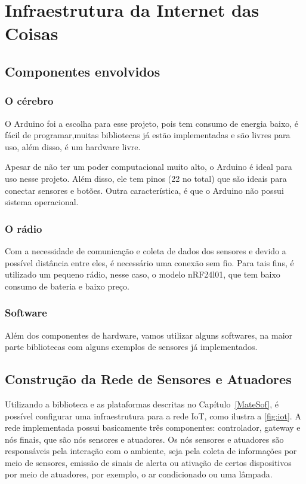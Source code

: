 %
\chapter{Infraestrutura da Internet das Coisas}


\section{Componentes envolvidos}

\subsection{O cérebro}

O Arduino foi a escolha para esse projeto, pois tem consumo de energia baixo, é fácil de programar,muitas bibliotecas já estão implementadas e são livres para uso, além disso, é um hardware livre. 

Apesar de não ter um poder computacional muito alto, o Arduino é ideal para uso nesse projeto. Além disso, ele tem pinos (22 no total) que são ideais para conectar sensores e botões. Outra característica, é que o Arduino não possui sistema operacional.

\subsection{O rádio}

Com a necessidade de comunicação e coleta de dados dos sensores e devido a possível distância entre eles, é necessário uma conexão sem fio. Para tais fins, é utilizado um pequeno rádio, nesse caso, o modelo nRF24l01, que tem baixo consumo de bateria e baixo preço.

\subsection{Software}

Além dos componentes de hardware, vamos utilizar alguns softwares, na maior parte bibliotecas com alguns exemplos de sensores já implementados. 

\section{Construção da Rede de Sensores e Atuadores}

Utilizando a biblioteca e as plataformas descritas no Capítulo~\ref{MateSof}, é possível configurar uma infraestrutura para a rede IoT, como ilustra a \ref{fig:iot}. A rede implementada possui
basicamente três componentes:
controlador, gateway e nós finais, que são nós sensores e atuadores. Os nós sensores e atuadores são responsáveis
pela interação com o ambiente, seja pela coleta de informações por meio de sensores, emissão de sinais de alerta ou ativação de certos dispositivos por meio de atuadores, por
exemplo, o ar condicionado ou uma lâmpada.

